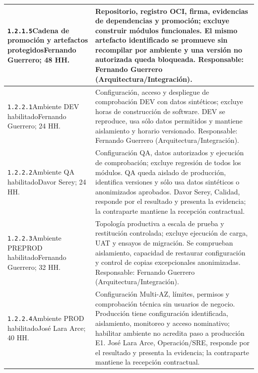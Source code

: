 \begin{longtable}{L{52mm}L{91mm}}
\texttt{1.\allowbreak{}2.\allowbreak{}1.\allowbreak{}5}\newline Cadena de promoción y artefactos protegidos\newline Fernando Guerrero; 48 HH. & Repositorio, registro OCI, firma, evidencias de dependencias y promoción; excluye construir módulos funcionales. El mismo artefacto identificado se promueve sin recompilar por ambiente y una versión no autorizada queda bloqueada. Responsable: Fernando Guerrero (Arquitectura/Integración).\\\hline
\texttt{1.\allowbreak{}2.\allowbreak{}2.\allowbreak{}1}\newline Ambiente DEV habilitado\newline Fernando Guerrero; 24 HH. & Configuración, acceso y despliegue de comprobación DEV con datos sintéticos; excluye horas de construcción de software. DEV se reproduce, usa sólo datos permitidos y mantiene aislamiento y horario versionado. Responsable: Fernando Guerrero (Arquitectura/Integración).\\\hline
\texttt{1.\allowbreak{}2.\allowbreak{}2.\allowbreak{}2}\newline Ambiente QA habilitado\newline Davor Serey; 24 HH. & Configuración QA, datos autorizados y ejecución de comprobación; excluye regresión de todos los módulos. QA queda aislado de producción, identifica versiones y sólo usa datos sintéticos o anonimizados aprobados. Davor Serey, Calidad, responde por el resultado y presenta la evidencia; la contraparte mantiene la recepción contractual.\\\hline
\texttt{1.\allowbreak{}2.\allowbreak{}2.\allowbreak{}3}\newline Ambiente PREPROD habilitado\newline Fernando Guerrero; 32 HH. & Topología productiva a escala de prueba y restitución controlada; excluye ejecución de carga, UAT y ensayos de migración. Se comprueban aislamiento, capacidad de restaurar configuración y control de copias excepcionales anonimizadas. Responsable: Fernando Guerrero (Arquitectura/Integración).\\\hline
\texttt{1.\allowbreak{}2.\allowbreak{}2.\allowbreak{}4}\newline Ambiente PROD habilitado\newline José Lara Arce; 40 HH. & Configuración Multi-AZ, límites, permisos y comprobación técnica sin usuarios de negocio. Producción tiene configuración identificada, aislamiento, monitoreo y acceso nominativo; habilitar ambiente no acredita paso a producción E1. José Lara Arce, Operación/SRE, responde por el resultado y presenta la evidencia; la contraparte mantiene la recepción contractual.\\\hline

\end{longtable}

